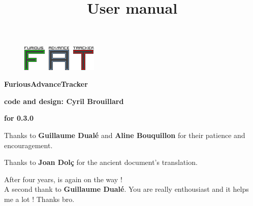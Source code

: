\documentclass[12pt,a4paper]{article}
\title{\bf \SimpleImage{images/furicat_color}{0.3} \\ User manual}
\author{\fatversion}
\begin{document}
  \begin{figure}
    \begin{center}
    \includegraphics[scale=2]{images/logo}
    \end{center}
  \end{figure}
  \maketitle{}
  \thispagestyle{empty}
  \setcounter{page}{0}
  \ClearShipoutPicture

  \newpage

  \begin{center}

  {\bf \FAT FuriousAdvanceTracker} \medskip

  {\bf code and design: Cyril Brouillard} \medskip

  {\bf for 0.3.0} \medskip

  Thanks to {\bf \textcolor{vert}{Guillaume Dualé}} and {\bf \textcolor{vert}{Aline Bouquillon}} for their patience and encouragement.\medskip
  
  Thanks to {\bf \textcolor{vert}{Joan Dolç}} for the ancient document's translation. \medskip

  {\bf \fatversion} \medskip

  After four years, \FAT is again on the way ! \\
  A second thank to {\bf \textcolor{vert}{Guillaume Dualé}}. You are really enthousiast and it helps me a lot ! Thanks bro.


  \end{center}
  
  \thispagestyle{empty}
  \setcounter{page}{0}
  \ClearShipoutPicture
  \newpage
  
  \tableofcontents{}
  \newpage
  
\end{document}
